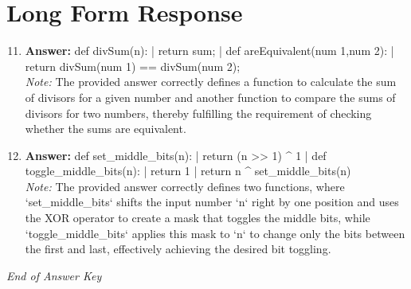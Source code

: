 \documentclass[12pt]{article}
\begin{document}
\section*{Long Form Response}
\begin{enumerate}[label=\arabic*.]
\setcounter{enumi}{10}
\item \textbf{Answer:} def divSum(n): | return sum; | def areEquivalent(num 1,num 2): | return divSum(num 1) == divSum(num 2);
\\ \textit{Note:} The provided answer correctly defines a function to calculate the sum of divisors for a given number and another function to compare the sums of divisors for two numbers, thereby fulfilling the requirement of checking whether the sums are equivalent.
\item \textbf{Answer:} def set\_middle\_bits(n): | return (n \textgreater{}\textgreater{} 1) ^ 1 | def toggle\_middle\_bits(n): | return 1 | return n ^ set\_middle\_bits(n)
\\ \textit{Note:} The provided answer correctly defines two functions, where `set\_middle\_bits` shifts the input number `n` right by one position and uses the XOR operator to create a mask that toggles the middle bits, while `toggle\_middle\_bits` applies this mask to `n` to change only the bits between the first and last, effectively achieving the desired bit toggling.
\end{enumerate}

\vfill
\noindent\textit{End of Answer Key}
\end{document}
